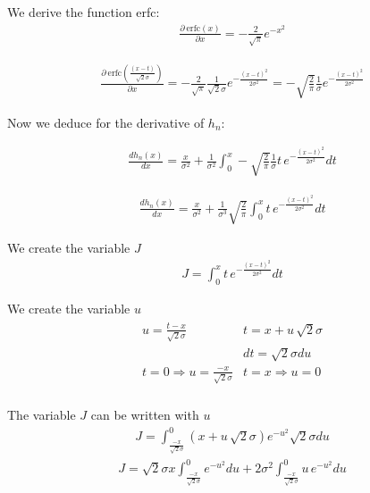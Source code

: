 We derive the function erfc:
\begin{eqnarray}
\frac{\partial \: \mbox{erfc}(x)}{\partial x} = - \frac{2}{\sqrt{\pi}}   e^{-x^{2}} 
\end{eqnarray}

\begin{eqnarray}
\frac{ \partial\:  \mbox{erfc}( \frac{(x-t)}{\sqrt{2}\sigma} )}{\partial x} = 
-\frac{2}{\sqrt{\pi}} \frac{1}{\sqrt{2}\sigma}  
  e^{-\frac{(x-t)^{2}}{2\sigma^{2}}} =
 -\sqrt{\frac{2}{\pi}} \frac{1}{\sigma} e^{-\frac{(x-t)^{2}}{2\sigma^{2}}}
\end{eqnarray}

Now we deduce for the derivative of $h_n$:

\begin{eqnarray}
\frac{d h_{n}(x)}{dx} = 
\frac{x}{\sigma^{2}}   +
\frac{1}{\sigma^{2}}\int_{0}^{x} 
 -\sqrt{\frac{2}{\pi}}\frac{1}{\sigma}t \, e^{-\frac{(x-t)^{2}}{2\sigma^{2}}}dt 
\end{eqnarray}

\begin{eqnarray}
\frac{d h_{n}(x)}{dx} = 
\frac{x}{\sigma^{2}}   +
\frac{1}{\sigma^{3}}\sqrt{\frac{2}{\pi}} \int_{0}^{x} t \, e^{-\frac{(x-t)^{2}}{2\sigma^{2}}}dt 
\end{eqnarray}

We create the variable $J$
\begin{eqnarray}
J = \int_{0}^{x} t \, e^{-\frac{(x-t)^{2}}{2\sigma^{2}}}dt 
\end{eqnarray}

We create the variable $u$
\begin{eqnarray}
\begin{array}{cc} 
  u = \frac{t-x}{\sqrt{2}\sigma}  &  t = x+u \, \sqrt{2}\sigma         \\
   & dt = \sqrt{2}\sigma du         \\
  t=0 \Rightarrow u = \frac{-x}{\sqrt{2}\sigma}  &
  t=x \Rightarrow u = 0                     \\
   \end{array}
\end{eqnarray}


The variable $J$ can be written with $u$
\begin{eqnarray}
 J = \int_{\frac{-x}{\sqrt{2}\sigma} }^{0} (x+u \,\sqrt{2}\sigma) e^{-u^{2}}\sqrt{2}\sigma du
\end{eqnarray}
\begin{eqnarray}
 J = \sqrt{2}\sigma x \int_{\frac{-x}{\sqrt{2}\sigma} }^{0} 
 e^{-u^{2}} du  +
 2 \sigma^{2} \int_{\frac{-x}{\sqrt{2}\sigma} }^{0} u \,
 e^{-u^{2}} du
\end{eqnarray}

